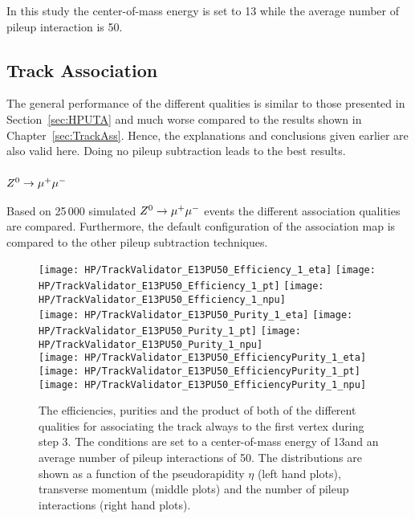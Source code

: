 In this study the center-of-mass energy is set to 13\TeV{} while the average number of pileup interaction is 50. 

\subsection{Track Association \label{sec:HPUAppE13PU50TA}}

The general performance of the different qualities is similar to those presented in Section~\ref{sec:HPUTA} and much worse compared to the results shown in Chapter~\ref{sec:TrackAss}. Hence, the explanations and conclusions given earlier are also valid here. Doing no pileup subtraction leads to the best results.

\subsubsection{${Z^{0}}\rightarrow\mu^+\mu^-$}

Based on 25\,000 simulated ${Z^{0}}\rightarrow\mu^+\mu^-$ events the different association qualities are compared. Furthermore, the default configuration of the association map is compared to the other pileup subtraction techniques.

\begin{figure}[!h]
  \centering
  \texttt{[image: HP/TrackValidator\_E13PU50\_Efficiency\_1\_eta]}
  \texttt{[image: HP/TrackValidator\_E13PU50\_Efficiency\_1\_pt]}
  \texttt{[image: HP/TrackValidator\_E13PU50\_Efficiency\_1\_npu]}
   \\
  \texttt{[image: HP/TrackValidator\_E13PU50\_Purity\_1\_eta]}
  \texttt{[image: HP/TrackValidator\_E13PU50\_Purity\_1\_pt]}
  \texttt{[image: HP/TrackValidator\_E13PU50\_Purity\_1\_npu]}
   \\
  \texttt{[image: HP/TrackValidator\_E13PU50\_EfficiencyPurity\_1\_eta]}
  \texttt{[image: HP/TrackValidator\_E13PU50\_EfficiencyPurity\_1\_pt]}
  \texttt{[image: HP/TrackValidator\_E13PU50\_EfficiencyPurity\_1\_npu]}
  \caption[Efficiencies, purities and their product of the different qualities of the association map with associating the track always to the first vertex during step 3 with 13\TeV and $\left<PU\right>=50$]{The efficiencies, purities and the product of both of the different qualities for associating the track always to the first vertex during step 3. The conditions are set to a center-of-mass energy of 13\TeV and an average number of pileup interactions of 50. The distributions are shown as a function of the pseudorapidity $\eta$ (left hand plots), transverse momentum (middle plots) and the number of pileup interactions (right hand plots).}
\end{figure}
\clearpage

